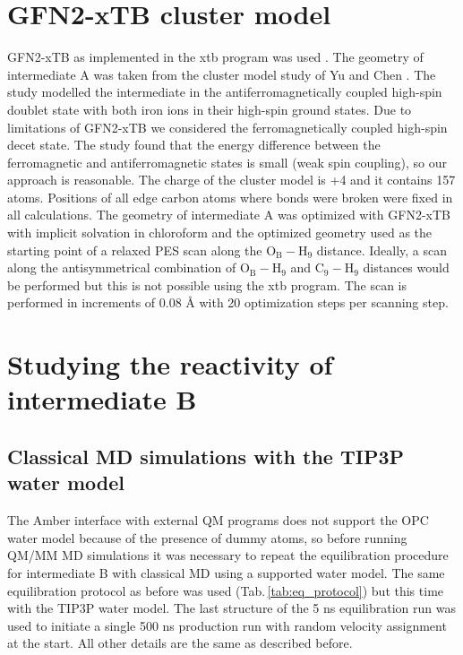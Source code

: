 \section{GFN2-xTB cluster model}
GFN2-xTB as implemented in the xtb program was used \cite{Bannwarth2019,Bannwarth2020,Grimme2017}. The geometry of intermediate A was taken from the cluster model study of Yu and Chen \cite{Yu2019}. The study modelled the intermediate in the antiferromagnetically coupled high-spin doublet state with both iron ions in their high-spin ground states. Due to limitations of GFN2-xTB we considered the ferromagnetically coupled high-spin decet state. The study found that the energy difference between the ferromagnetic and antiferromagnetic states is small (weak spin coupling), so our approach is reasonable. The charge of the cluster model is +4 and it contains 157 atoms. Positions of all edge carbon atoms where bonds were broken were fixed in all calculations. The geometry of intermediate A was optimized with GFN2-xTB with implicit solvation in chloroform and the optimized geometry used as the starting point of a relaxed PES scan along the O$_{\text{B}}-$H$_{9}$ distance. Ideally, a scan along the antisymmetrical combination of O$_{\text{B}}-$H$_{9}$ and C$_{9}-$H$_{9}$ distances would be performed but this is not possible using the xtb program. The scan is performed in increments of 0.08 Å with 20 optimization steps per scanning step. 

\section{Studying the reactivity of intermediate B}
\subsection{Classical MD simulations with the TIP3P water model}
The Amber interface with external QM programs does not support the OPC water model because of the presence of dummy atoms, so before running QM/MM MD simulations it was necessary to repeat the equilibration procedure for intermediate B with classical MD using a supported water model. The same equilibration protocol as before was used (Tab.\,\ref{tab:eq_protocol}) but this time with the TIP3P water model. The last structure of the 5 ns equilibration run was used to initiate a single 500 ns production run with random velocity assignment at the start. All other details are the same as described before.

